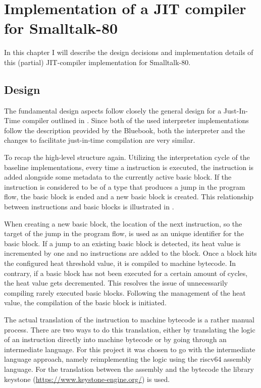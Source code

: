 \chapter{Implementation of a JIT compiler for Smalltalk-80}
In this chapter I will describe the design decisions and implementation details of this (partial) JIT-compiler implementation for Smalltalk-80.
\section{Design}
The fundamental design aspects follow closely the general design for a Just-In-Time compiler outlined in .
Since both of the used interpreter implementations follow the description provided by the Bluebook, both the interpreter and the changes to facilitate just-in-time compilation are very similar. 

To recap the high-level structure again. Utilizing the interpretation cycle of the baseline implementations, every time a instruction is executed, the instruction is added alongside some metadata to the currently active basic block. If the instruction is considered to be of a type that produces a jump in the program flow, the basic block is ended and a new basic block is created. This relationship between instructions and basic blocks is illustrated in . 

When creating a new basic block, the location of the next instruction, so the target of the jump in the program flow, is used as an unique identifier for the basic block. 
If a jump to an existing basic block is detected, its heat value is incremented by one and no instructions are added to the block. 
Once a block hits the configured heat threshold value, it is compiled to machine bytecode. In contrary, if a basic block has not been executed for a certain amount of cycles, the heat value gets decremented. This resolves the issue of unnecessarily compiling rarely executed basic blocks. 
Following the management of the heat value, the compilation of the basic block is initiated.

The actual translation of the instruction to machine bytecode is a rather manual process. There are two ways to do this translation, either by translating the logic of an instruction directly into machine bytecode or by going through an intermediate language. For this project it was chosen to go with the intermediate language approach, namely reimplementing the logic using the riscv64 assembly language. For the translation between the assembly and the bytecode the library keystone (\url{https://www.keystone-engine.org/}) is used.

